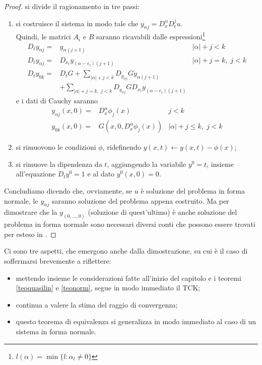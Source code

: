 \begin{proof}
si divide il ragionamento in tre passi:
\begin{enumerate}
\item si costruisce il sistema in modo tale che $y_{\alpha j}= D^\alpha_x D^j_t u$. \\
Quindi, le matrici $A_i$ e $B$ saranno ricavabili dalle espressioni\footnote{$l(\alpha)=\min\{ l:\alpha_l\neq 0 \} $}
\begin{align*}
D_t y_{\alpha j} =& y_{\alpha (j+1)} & |\alpha| + j < k \\
D_t y_{\alpha j} =& D_{x_l} y_{(\alpha-e_l)(j+1)} & |\alpha| + j = k, \; j < k\\
D_t y_{0k} =& D_tG + \sum_{|\alpha|+j < k} D_{y_{\alpha j}}G y_{\alpha (j+1)} \\
& + \sum_{|\alpha|+j = k, \; j < k} D_{y_{\alpha j}} G D_{x_l} y_{(\alpha-e_l)(j+1)}
\end{align*}
e i dati di Cauchy saranno
\begin{align*}
y_{\alpha j}(x, 0) = & D_x^{\alpha} \phi_j(x) & j < k\\
y_{0k}(x, 0) = & G\left( x, 0, D_x^{\alpha} \phi_j(x) \right) & \lvert \alpha \rvert + j \leq k, \; j < k
\end{align*}
\item si rimuovono le condizioni $\phi$, ridefinendo $y(x,t)\leftarrow y(x,t)-\phi (x)$;
\item si rimuove la dipendenza da $t$, aggiungendo la variabile $y^0=t$, insieme all'equazione $D_t y^0=1$ e al dato $y^0(x,0)=0$.
\end{enumerate}
Concludiamo dicendo che, ovviamente, se $u$ è soluzione del problema in forma normale, le $y_{\alpha j}$ saranno soluzione del problema appena costruito. Ma per dimostrare che la $y_{(0,\ldots,0)}$ (soluzione di quest'ultimo) è anche soluzione del problema in forma normale sono necessari diversi conti che possono essere trovati per esteso in \cite[cap.1]{Folland}.
\end{proof}

\begin{remark}
Ci sono tre aspetti, che emergono anche dalla dimostrazione, su cui è il caso di soffermarsi brevemente a riflettere:
\begin{itemize}
\item mettendo insieme le considerazioni fatte all'inizio del capitolo e i teoremi \ref{teoquasilin} e \ref{teonorm}, segue in modo immediato il TCK;
\item continua a valere la stima del raggio di convergenza;
\item questo teorema di equivalenza si generalizza in modo immediato al caso di un sistema in forma normale.
\end{itemize}
\end{remark}








